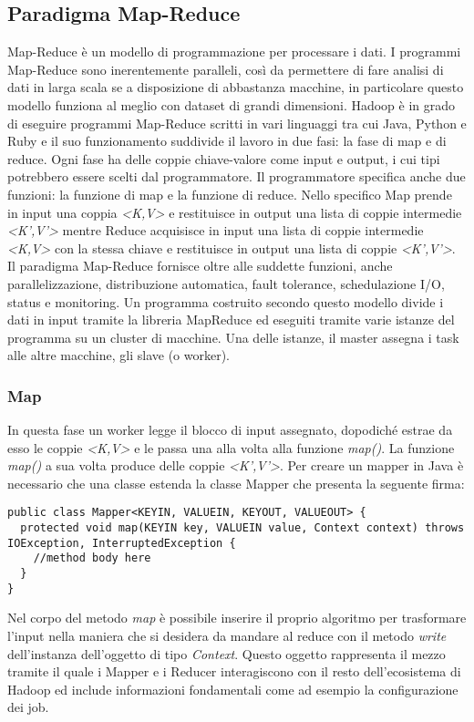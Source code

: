 \subsection{Paradigma Map-Reduce}
Map-Reduce è un modello di programmazione per processare i dati. I programmi Map-Reduce sono inerentemente paralleli, così da permettere di fare analisi di dati in larga scala se a disposizione di abbastanza macchine, in particolare questo modello funziona al meglio con dataset di grandi dimensioni. Hadoop è in grado di eseguire programmi Map-Reduce scritti in vari linguaggi tra cui Java, Python e Ruby e il suo funzionamento suddivide il lavoro in due fasi: la fase di map e di reduce. Ogni fase ha delle coppie chiave-valore come input e output, i cui tipi potrebbero essere scelti dal programmatore. Il programmatore specifica anche due funzioni: la funzione di map e la funzione di reduce. Nello specifico Map prende in input una coppia \textit{<K,V>} e restituisce in output una lista di coppie intermedie \textit{<K',V'>} mentre Reduce acquisisce in input una lista di coppie intermedie \textit{<K,V> } con la stessa chiave e restituisce in output una lista di coppie \textit{<K',V'>}. Il paradigma Map-Reduce fornisce oltre alle suddette funzioni, anche parallelizzazione, distribuzione automatica, fault tolerance, schedulazione I/O, status e monitoring. Un programma costruito secondo questo modello divide i dati in input tramite la libreria MapReduce ed eseguiti tramite varie istanze del programma su un cluster di macchine. Una delle istanze, il master assegna i task alle altre macchine, gli slave (o worker).
\subsubsection{Map}
In questa fase un worker legge il blocco di input assegnato, dopodiché estrae da esso le coppie \textit{<K,V>} e le passa una alla volta alla funzione \textit{map()}. La funzione \textit{map()} a sua volta produce delle coppie \textit{<K',V'>}. Per creare un mapper in Java è necessario che una classe estenda la classe Mapper che presenta la seguente firma:
\begin{lstlisting}
public class Mapper<KEYIN, VALUEIN, KEYOUT, VALUEOUT> {
  protected void map(KEYIN key, VALUEIN value, Context context) throws IOException, InterruptedException {
    //method body here
  }
}
\end{lstlisting}
Nel corpo del metodo \textit{map} è possibile inserire il proprio algoritmo per trasformare l'input nella maniera che si desidera da mandare al reduce con il metodo \textit{write} dell'instanza dell'oggetto di tipo \textit{Context}. Questo oggetto rappresenta il mezzo tramite il quale i Mapper e i Reducer interagiscono con il resto dell'ecosistema di Hadoop ed include informazioni fondamentali come ad esempio la configurazione dei job.

